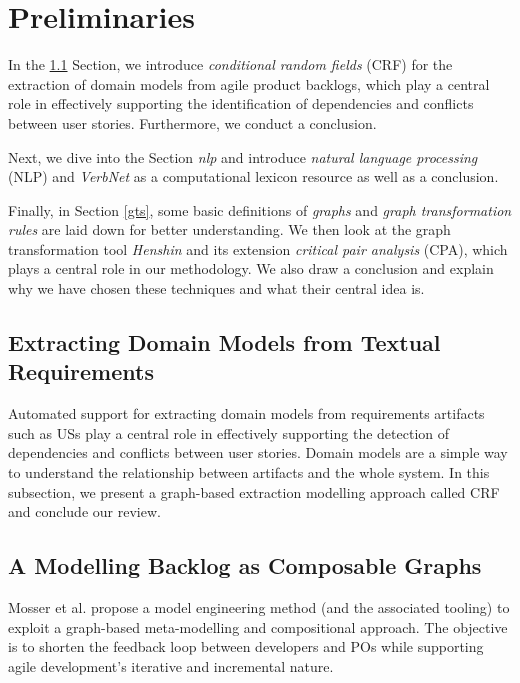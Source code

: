 \section{Preliminaries}\label{preliminaries}

In the \ref{dmodel} Section, we introduce \emph{conditional random fields} (CRF) for the extraction of domain models from agile product backlogs, which play a central role in effectively supporting the identification of dependencies and conflicts between user stories. Furthermore, we conduct a conclusion.

Next, we dive into the Section \emph{nlp} and introduce \emph{natural language processing} (NLP) and \emph{VerbNet} as a computational lexicon resource as well as a conclusion.

Finally, in Section \ref{gts}, some basic definitions of \emph{graphs} and \emph{graph transformation rules} are laid down for better understanding. We then look at the graph transformation tool \emph{Henshin} and its extension \emph{critical pair analysis} (CPA), which plays a central role in our methodology. We also draw a conclusion and explain why we have chosen these techniques and what their central idea is.

\subsection{Extracting Domain Models from Textual Requirements}\label{dmodel}
Automated support for extracting domain models from requirements artifacts such as USs play a central role in effectively supporting the detection of dependencies and conflicts between user stories. Domain models are a simple way to understand the relationship between artifacts and the whole system. In this subsection, we present a graph-based extraction modelling approach called CRF and conclude our review.
\subsection*{A Modelling Backlog as Composable Graphs} \label{composable_graph}
Mosser et al. propose a model engineering method (and the associated tooling) to exploit a graph-based meta-modelling and compositional approach. The objective is to shorten the feedback loop between developers and POs while supporting agile development’s iterative and incremental nature. 

